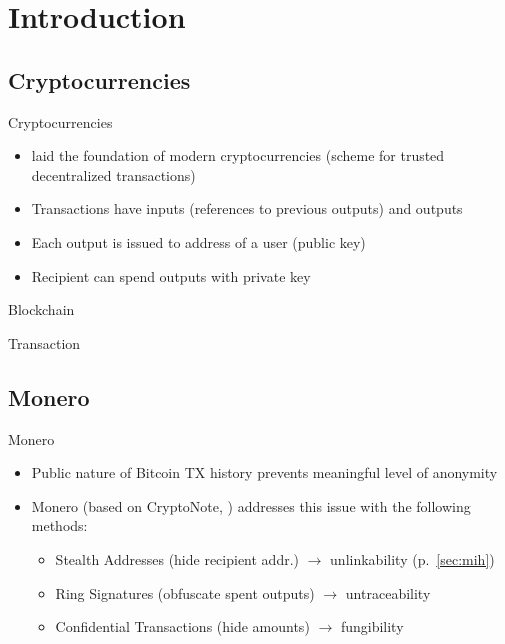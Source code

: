 
\section{Introduction}
\subsection{Cryptocurrencies}
\begin{frame}{Cryptocurrencies}
	\begin{itemize}
	\item \cite{nakamoto_bitcoin:_2008}	laid the foundation of modern cryptocurrencies (scheme for trusted decentralized transactions)	
	\item Transactions have inputs (references to previous outputs) and outputs
	\item Each output is issued to address of a user (public key)
	\item Recipient can spend outputs with private key
	\end{itemize}
\end{frame}

\begin{frame}{Blockchain}
	\resizebox{\textwidth}{!}{}
\end{frame}

\begin{frame}{Transaction}
	\resizebox{\textwidth}{!}{}
\end{frame}

\subsection{Monero}
\begin{frame}{Monero}\label{sec:monero}
	\begin{itemize}
		\item Public nature of Bitcoin TX history prevents meaningful level of anonymity
		\item Monero (based on CryptoNote, \cite{van_saberhagen_cryptonote_2013}) addresses this issue with the following methods:
		\begin{itemize}[<+-|alert@+>]
			\item Stealth Addresses (hide recipient addr.) $\to$ unlinkability (p.~\ref{sec:mih})
			\item \alert<4->{Ring Signatures (obfuscate spent outputs) $\to$ untraceability}
			\item Confidential Transactions (hide amounts) $\to$ fungibility
		\end{itemize} 
	\end{itemize}
\end{frame}

